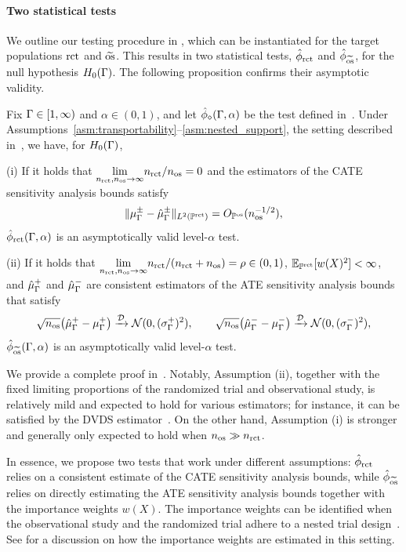 \paragraph{Two statistical tests} We outline our testing procedure in , which can be instantiated for the target populations $\mathrm{rct}$ and $\widetilde{\mathrm{os}}$. This results in two statistical tests, $\hat{\phi}_{\mathrm{rct}}$ and $\hat{\phi}_{\widetilde{\mathrm{os}}}$, for the null hypothesis $H_0(\Gamma)$. The following proposition confirms their asymptotic validity.
\begin{prop}
\label{prop:test} Fix $\Gamma \in [1,\infty)$ and $\alpha \in (0,1)$, and let $\hat{\phi}_\diamond(\Gamma,\alpha)$ be the test defined in~. Under Assumptions~\ref{asm:transportability}--\ref{asm:nested_support}, the setting described in~, we have, for $H_0(\Gamma)$, 
 
(i) If it holds that $  \underset{n_{\operatorname{rct}},n_{\operatorname{os}} \to \infty}{\lim} n_{\operatorname{rct}}/n_{\operatorname{os}}=  0$ and the estimators of
 the CATE sensitivity analysis bounds satisfy	
$$\|\mu_\Gamma^{\pm} - \hat{\mu}_\Gamma^{\pm}\|_{L^2(\mathbb{P}^{\operatorname{rct}})} = O_{\mathbb{P}^{\operatorname{os}}}(n_{\operatorname{os}}^{-1/2}),$$
$\hat{\phi}_{\mathrm{rct}}(\Gamma, \alpha)$ is an asymptotically valid level-$\alpha$ test.
	
(ii) If it holds that $\underset{n_{\operatorname{rct}},n_{\operatorname{os}} \to \infty}{\lim}n_{\operatorname{rct}}/(n_{\operatorname{rct}}+n_{\operatorname{os}})=\rho \in (0,1)$, $\mathbb{E}_{\mathbb{P}^{\operatorname{rct}}}[w(X)^2] < \infty$, and $\hat{\mu}_\Gamma^+$ and $\hat{\mu}_\Gamma^-$ are consistent estimators of the ATE sensitivity analysis bounds that satisfy
$$
 \sqrt{n_{\operatorname{os}}}\bigl(\hat{\mu}_\Gamma^+ - \mu_\Gamma^+\bigr)\xrightarrow{\mathcal{D}} \mathcal{N}(0,(\sigma_\Gamma^+)^2), \qquad \sqrt{n_{\operatorname{os}}}\bigl(\hat{\mu}_\Gamma^- - \mu_\Gamma^-\bigr)\xrightarrow{\mathcal{D}} \mathcal{N}(0,(\sigma_\Gamma^-)^2), 
$$
$\hat{\phi}_{\widetilde{\mathrm{os}}}(\Gamma, \alpha)$ is an asymptotically valid level-$\alpha$ test.
\end{prop} 
We provide a complete proof in~. Notably, Assumption (ii), together with the fixed limiting proportions of the randomized trial and observational study, is relatively mild and expected to hold for various estimators; for instance, it can be satisfied by the DVDS estimator~\citep{dorn2021doubly}. On the other hand, Assumption (i) is stronger and generally only expected to hold when $n_{\operatorname{os}}\gg n_{\operatorname{rct}}$.

In essence, we propose two tests that work under different assumptions: $\hat{\phi}_{\mathrm{rct}}$ relies on a consistent estimate of the CATE sensitivity analysis bounds, while $\hat{\phi}_{\widetilde{\mathrm{os}}}$ relies on directly estimating the ATE sensitivity analysis bounds together with the importance weights $w(X)$. The importance weights can be identified when the observational study and the randomized trial adhere to a nested trial design~\citep{olschewski1985comprehensive, olschewski1992analysis, choudhry2017randomized}. See  for a discussion on how the importance weights are estimated in this setting.





